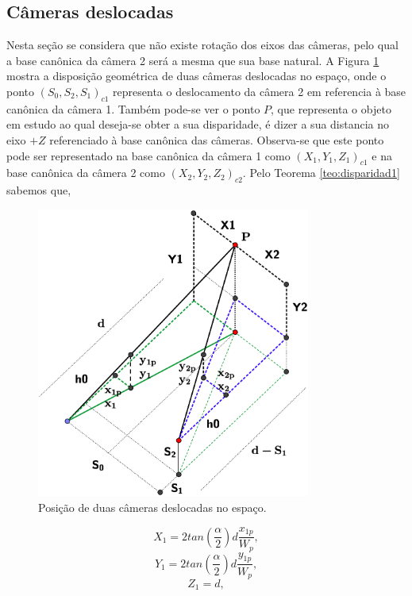 \documentclass[a4paper,10pt]{article}
\begin{document}
\subsection{Câmeras deslocadas} \label{subsec:desloca}
Nesta seção se considera que não existe rotação dos eixos das câmeras, pelo qual a base canônica da câmera 2
será a mesma que sua base natural.
A Figura \ref{fig:dispar} mostra a disposição geométrica de duas câmeras deslocadas no espaço, onde
o ponto $(S_0,S_2,S_1)_{c1}$ representa o deslocamento da câmera 2 em referencia à base canônica da câmera 1.
Também pode-se ver o ponto $P$, que representa o objeto em estudo ao qual deseja-se obter a sua disparidade,
é dizer a sua distancia no eixo $+Z$ referenciado à base canônica das câmeras.
Observa-se que este ponto pode ser representado na base canônica da câmera 1 como $(X_1,Y_1,Z_1)_{c1}$ e na base 
canônica da câmera 2 como $(X_2,Y_2,Z_2)_{c2}$. Pelo Teorema \ref{teo:disparidad1} sabemos que,
\begin{figure}[!]
\center
 \includegraphics[width=9.0cm]{./images/Diagrama.eps}
\caption{Posição de duas câmeras deslocadas no espaço.}
\label{fig:dispar}
\end{figure} 
\begin{equation}\label{eq:desloca2}
 X_1=2 tan(\frac{\alpha}{2})d\frac{x_{1p}}{W_p},
\end{equation}
\begin{equation}\label{eq:desloca2a}
 Y_1=2 tan(\frac{\alpha}{2})d\frac{y_{1p}}{W_p},
\end{equation}
\begin{equation}\label{eq:desloca4}
 Z_1=d,
\end{equation}
\end{document}
